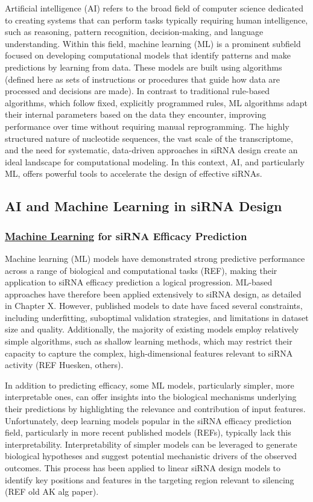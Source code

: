 \documentclass{report}
\begin{document}
Artificial intelligence (AI) refers to the broad field of computer science dedicated to creating systems that can perform tasks typically requiring human intelligence, such as reasoning, pattern recognition, decision-making, and language understanding. Within this field, machine learning (ML) is a prominent subfield focused on developing computational models that identify patterns and make predictions by learning from data. These models are built using algorithms (defined here as sets of instructions or procedures that guide how data are processed and decisions are made). In contrast to traditional rule-based algorithms, which follow fixed, explicitly programmed rules, ML algorithms adapt their internal parameters based on the data they encounter, improving performance over time without requiring manual reprogramming. The highly structured nature of nucleotide sequences, the vast scale of the transcriptome, and the need for systematic, data-driven approaches in siRNA design create an ideal landscape for computational modeling. In this context, AI, and particularly ML, offers powerful tools to accelerate the design of effective siRNAs.


\subsection{AI and Machine Learning in siRNA Design}
\subsubsection{\underline{Machine Learning}  for siRNA Efficacy Prediction}
Machine learning (ML) models have demonstrated strong predictive performance across a range of biological and computational tasks (REF), making their application to siRNA efficacy prediction a logical progression. ML-based approaches have therefore been applied extensively to siRNA design, as detailed in Chapter X. However, published models to date have faced several constraints, including underfitting, suboptimal validation strategies, and limitations in dataset size and quality. Additionally, the majority of existing models employ relatively simple algorithms, such as shallow learning methods, which may restrict their capacity to capture the complex, high-dimensional features relevant to siRNA activity (REF Huesken, others).

In addition to predicting efficacy, some ML models, particularly simpler, more interpretable ones, can offer insights into the biological mechanisms underlying their predictions by highlighting the relevance and contribution of input features. Unfortunately, deep learning models popular in the siRNA efficacy prediction field, particularly in more recent published models (REFs), typically lack this interpretability. Interpretability of simpler models can be leveraged to generate biological hypotheses and suggest potential mechanistic drivers of the observed outcomes. This process has been applied to linear siRNA design models to identify key positions and features in the targeting region relevant to silencing (REF old AK alg paper). 
\end{document}
